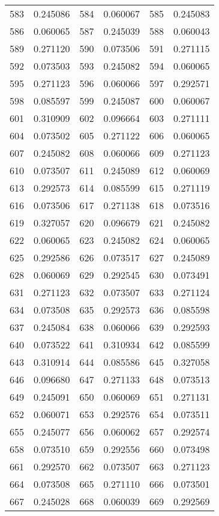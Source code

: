 \documentclass[12pt]{article}
\begin{document}
\begin{longtable}{@{}cc|cc|cc@{}}
583 & 0.245086 & 584 & 0.060067 & 585 & 0.245083 \\
586 & 0.060065 & 587 & 0.245039 & 588 & 0.060043 \\
589 & 0.271120 & 590 & 0.073506 & 591 & 0.271115 \\
592 & 0.073503 & 593 & 0.245082 & 594 & 0.060065 \\
595 & 0.271123 & 596 & 0.060066 & 597 & 0.292571 \\
598 & 0.085597 & 599 & 0.245087 & 600 & 0.060067 \\
601 & 0.310909 & 602 & 0.096664 & 603 & 0.271111 \\
604 & 0.073502 & 605 & 0.271122 & 606 & 0.060065 \\
607 & 0.245082 & 608 & 0.060066 & 609 & 0.271123 \\
610 & 0.073507 & 611 & 0.245089 & 612 & 0.060069 \\
613 & 0.292573 & 614 & 0.085599 & 615 & 0.271119 \\
616 & 0.073506 & 617 & 0.271138 & 618 & 0.073516 \\
619 & 0.327057 & 620 & 0.096679 & 621 & 0.245082 \\
622 & 0.060065 & 623 & 0.245082 & 624 & 0.060065 \\
625 & 0.292586 & 626 & 0.073517 & 627 & 0.245089 \\
628 & 0.060069 & 629 & 0.292545 & 630 & 0.073491 \\
631 & 0.271123 & 632 & 0.073507 & 633 & 0.271124 \\
634 & 0.073508 & 635 & 0.292573 & 636 & 0.085598 \\
637 & 0.245084 & 638 & 0.060066 & 639 & 0.292593 \\
640 & 0.073522 & 641 & 0.310934 & 642 & 0.085599 \\
643 & 0.310914 & 644 & 0.085586 & 645 & 0.327058 \\
646 & 0.096680 & 647 & 0.271133 & 648 & 0.073513 \\
649 & 0.245091 & 650 & 0.060069 & 651 & 0.271131 \\
652 & 0.060071 & 653 & 0.292576 & 654 & 0.073511 \\
655 & 0.245077 & 656 & 0.060062 & 657 & 0.292574 \\
658 & 0.073510 & 659 & 0.292556 & 660 & 0.073498 \\
661 & 0.292570 & 662 & 0.073507 & 663 & 0.271123 \\
664 & 0.073508 & 665 & 0.271110 & 666 & 0.073501 \\
667 & 0.245028 & 668 & 0.060039 & 669 & 0.292569 \\

\end{longtable}
\end{document}
